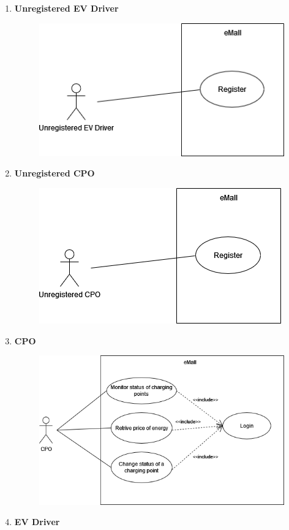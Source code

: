 \begin{enumerate}
    \item \textbf{Unregistered EV Driver}
          \begin{figure}[H]
              \centering
              \includegraphics[scale=0.8]{src/use_case_diagram/driver_registration.png}
          \end{figure}
    \item \textbf{Unregistered CPO}
          \begin{figure}[H]
              \centering
              \includegraphics[scale=0.8]{src/use_case_diagram/cpo_registration.png}
          \end{figure}
    \item \textbf{CPO}
          \begin{figure}[H]
              \centering
              \includegraphics[scale=0.8]{src/use_case_diagram/cpo.png}
          \end{figure}
    \item \textbf{EV Driver}
\end{enumerate}
